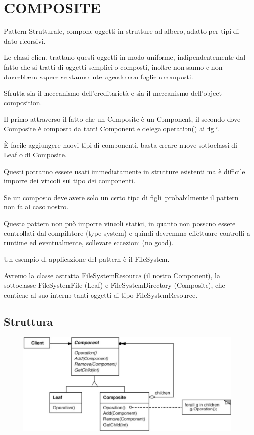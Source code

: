 \chapter{COMPOSITE}

Pattern Strutturale, compone oggetti in strutture ad albero, adatto per tipi di dato ricorsivi.

Le classi client trattano questi oggetti in modo uniforme, indipendentemente dal fatto che si tratti di oggetti semplici o composti, inoltre non sanno e non dovrebbero
sapere se stanno interagendo con foglie o composti.

Sfrutta sia il meccanismo dell'ereditarietà e sia il meccanismo dell'object composition.

Il primo attraverso il fatto che un Composite è un Component, il secondo dove Composite è composto da tanti Component e delega operation() ai figli.

È facile aggiungere nuovi tipi di componenti, basta creare nuove sottoclassi di Leaf o di Composite.

Questi potranno essere usati immediatamente in strutture esistenti ma è difficile imporre dei vincoli sul tipo dei componenti.

Se un composto deve avere solo un certo tipo di figli, probabilmente il pattern non fa al caso nostro.

Questo pattern non può imporre vincoli statici, in quanto non possono essere controllati dal compilatore (type system) e quindi dovremmo effettuare controlli a runtime
ed eventualmente, sollevare eccezioni (no good).

Un esempio di applicazione del pattern è il FileSystem.

Avremo la classe astratta FileSystemResource (il nostro Component), la sottoclasse FileSystemFile (Leaf) e FileSystemDirectory (Composite), che contiene al suo interno
tanti oggetti di tipo FileSystemResource.

\section{Struttura}

\begin{figure}[H]
    \centering
    \includegraphics[width=0.5\linewidth]{../../immagini/composite/struttura_composite}
\end{figure}

